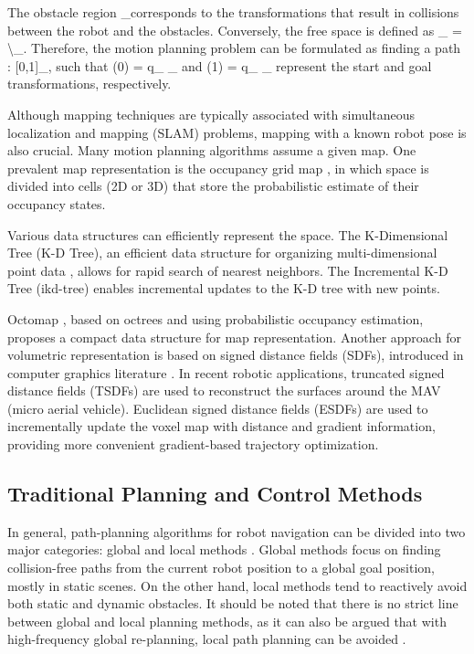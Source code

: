 The obstacle region \robotConfig_{}\subseteq \robotConfig corresponds to the transformations that result in collisions between the robot and the obstacles. Conversely, the free space is defined as \robotConfig_{} = \robotConfig \backslash \robotConfig_{}. Therefore, the motion planning problem can be formulated as finding a path \tau : [0,1]\rightarrow \robotConfig_{}, such that \tau(0) = q_{} \in \robotConfig_{} and \tau(1) = q_{} \in \robotConfig_{} represent the start and goal transformations, respectively.

Although mapping techniques are typically associated with simultaneous localization and mapping (SLAM) problems, mapping with a known robot pose is also crucial. Many motion planning algorithms assume a given map. One prevalent map representation is the occupancy grid map \cite{elfes2013occupancy}, in which space is divided into cells (2D or 3D) that store the probabilistic estimate of their occupancy states.

Various data structures can efficiently represent the space. The K-Dimensional Tree (K-D Tree), an efficient data structure for organizing multi-dimensional point data \cite{bentley1975multidimensional}, allows for rapid search of nearest neighbors. The Incremental K-D Tree (ikd-tree) \cite{cai2021ikd} enables incremental updates to the K-D tree with new points.

Octomap \cite{wurm2010octomap}, based on octrees and using probabilistic occupancy estimation, proposes a compact data structure for map representation. Another approach for volumetric representation is based on signed distance fields (SDFs), introduced in computer graphics literature \cite{curless1996volumetric}. In recent robotic applications, truncated signed distance fields (TSDFs) \cite{lin2018autonomous} are used to reconstruct the surfaces around the MAV (micro aerial vehicle). Euclidean signed distance fields (ESDFs) \cite{oleynikova2017voxblox,han2019fiesta} are used to incrementally update the voxel map with distance and gradient information, providing more convenient gradient-based trajectory optimization.

\subsection{Traditional Planning and Control Methods}

In general, path-planning algorithms for robot navigation can be divided into two major categories: global and local methods \cite{Lavalle-2006}. Global methods focus on finding collision-free paths from the current robot position to a global goal position, mostly in static scenes. On the other hand, local methods tend to reactively avoid both static and dynamic obstacles. It should be noted that there is no strict line between global and local planning methods, as it can also be argued that with high-frequency global re-planning, local path planning can be avoided \cite{fraichard-2020}.

